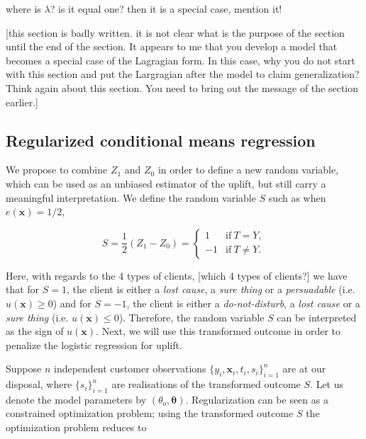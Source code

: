 \documentclass{article}
\def\x{\mathbf x}
\def \vahid {\color{magenta}}
\begin{document}
{\vahid where is $\lambda$? is it equal one? then it is a special case, mention it!}


{\vahid [this section is badly written. it is not clear what is the purpose of the section until the end of the section. It appears to me that you develop a model that becomes a special case of the Lagragian form. In this case, why you do not start with this section and put the Largragian after the model to claim generalization? Think again about this section. You need to bring out the message of the section earlier.]}


\subsection{Regularized conditional means regression}
\label{sec:smite_to}


We propose to combine $Z_1$ and $Z_0$ in order to define a new random variable, which can be used as an unbiased estimator of the uplift, but still carry a meaningful interpretation. We define the random variable $S$ such as when $e(\x) = 1/2$, 

\begin{equation}
   S =  \frac{1}{2} (Z_1 - Z_0)  = 
    \left\{ \begin{array}{cc}
       1 & \mathrm{if} ~ T = Y, \\
      -1 & \mathrm{if} ~ T \neq Y.
            \end{array} \right.
    \label{eq:transformed_outcome_sign}
\end{equation}


Here, with regards to the 4 types of clients, {\vahid [which 4 types of clients?]} we have that for $S=1$, the client is either a \textit{lost cause}, a \textit{sure thing} or a \textit{persuadable} (i.e. $u(\x) \geq 0$) and for $S=-1$, the client is either a \textit{do-not-disturb}, a \textit{lost cause} or a \textit{sure thing} (i.e. $u(\x) \leq 0$). Therefore, the random variable $S$ can be interpreted as the sign of $u(\x)$. Next, we will use this transformed outcome in order to penalize the logistic regression for uplift.



Suppose $n$ independent customer observations $\{y_i, \textbf{x}_i, t_i, s_i\}_{i=1}^n$ are at our disposal, where $\{s_i\}_{i=1}^n$ are realisations of the transformed outcome $S$. Let us denote the model parameters by $(\theta_o, \boldsymbol{\theta})$. Regularization can be seen as a constrained optimization problem; using the transformed outcome $S$ the optimization problem reduces to
\end{document}
